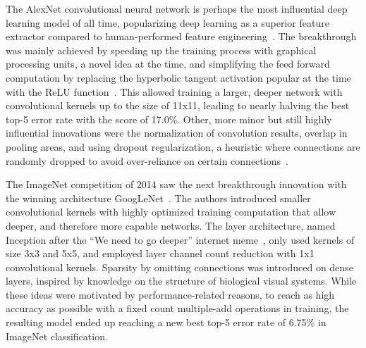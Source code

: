\documentclass[english,twoside,openright]{UH_DS_MSc}
\begin{document}
The AlexNet convolutional neural network is perhaps the most influential deep learning model of all time, 
popularizing deep learning as a superior feature extractor compared to human-performed feature engineering~\cite{princebook}.
The breakthrough was mainly achieved by speeding up the training process with graphical processing units, a novel idea at the time, and simplifying the feed forward computation by replacing the
hyperbolic tangent activation popular at the time with the ReLU function~\cite{alexnet}.
 This allowed training a larger, deeper network
with convolutional kernels up to the size of 11x11, leading to nearly halving the best top-5 error rate with the score of
17.0\%. Other, more minor but still highly influential innovations were the normalization of convolution results, 
overlap in pooling areas, and using dropout regularization, a heuristic where connections are randomly dropped to avoid over-reliance on certain connections~\cite{dropout}.

The ImageNet competition of 2014 saw the next breakthrough innovation with the winning architecture GoogLeNet~\cite{googlelenet}. The authors
introduced smaller convolutional kernels with highly optimized training computation that allow deeper,
and therefore more capable networks. The layer architecture, named Inception after the ``We 
need to go deeper'' internet meme~\cite{we_need_to_go_deeper}, only used kernels of size 3x3 and 5x5, and
employed layer channel count reduction with 1x1 convolutional kernels. Sparsity by omitting connections was introduced on dense layers, inspired by knowledge on the structure of biological visual systems. While these ideas were motivated
by performance-related reasons, to reach as high accuracy as possible with a fixed count multiple-add operations in training, the resulting model ended up reaching a new best top-5 error rate of 6.75\%
in ImageNet classification.
\end{document}
